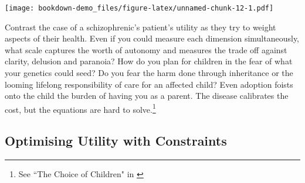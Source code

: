 \documentclass[
]{book}
\newenvironment{Shaded}{\begin{snugshade}}{\end{snugshade}}
\newcommand{\ControlFlowTok}[1]{\textcolor[rgb]{0.13,0.29,0.53}{\textbf{#1}}}
\newcommand{\DecValTok}[1]{\textcolor[rgb]{0.00,0.00,0.81}{#1}}
\newcommand{\FloatTok}[1]{\textcolor[rgb]{0.00,0.00,0.81}{#1}}
\newcommand{\KeywordTok}[1]{\textcolor[rgb]{0.13,0.29,0.53}{\textbf{#1}}}
\newcommand{\NormalTok}[1]{#1}
\newcommand{\OperatorTok}[1]{\textcolor[rgb]{0.81,0.36,0.00}{\textbf{#1}}}
\newcommand{\SpecialCharTok}[1]{\textcolor[rgb]{0.00,0.00,0.00}{#1}}
\newcommand{\StringTok}[1]{\textcolor[rgb]{0.31,0.60,0.02}{#1}}
\newcommand{\VerbatimStringTok}[1]{\textcolor[rgb]{0.31,0.60,0.02}{#1}}
\theoremstyle{definition}
\theoremstyle{definition}
\theoremstyle{definition}
\theoremstyle{remark}
\begin{document}
\begin{Shaded}
\end{Shaded}

\texttt{[image: bookdown-demo\_files/figure-latex/unnamed-chunk-12-1.pdf]}

Contrast the case of a schizophrenic's patient's utility as they try to weight aspects of their health. Even if you could measure each dimension simultaneously, what scale captures the worth of autonomy and measures the trade off against clarity, delusion and paranoia? How do you plan for children in the fear of what your genetics could seed? Do you fear the harm done through inheritance or the looming lifelong responsibility of care for an affected child? Even adoption foists onto the child the burden of having you as a parent. The disease calibrates the cost, but the equations are hard to solve.\footnote{See ``The Choice of Children" in \citep{WangSchizophrenia}}

\hypertarget{optimising-utility-with-constraints}{%
\subsection{Optimising Utility with Constraints}\label{optimising-utility-with-constraints}}
\end{document}
